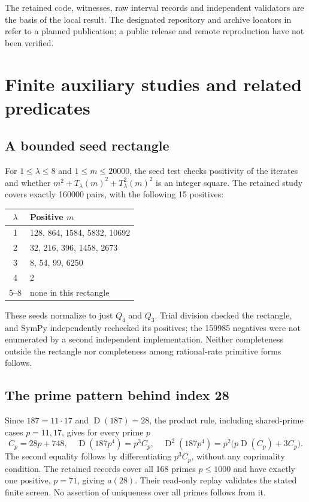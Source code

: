 \documentclass[11pt]{article}
\newcommand{\D}{\operatorname{D}}
\theoremstyle{definition}
\begin{document}
The retained code, witnesses, raw interval records and independent
validators are the basis of the local result. The designated repository
and archive locators in~\cite{project} refer to a planned publication;
a public release and remote reproduction have not been verified.

\section{Finite auxiliary studies and related predicates}\label{sec:finite}
\subsection{A bounded seed rectangle}
For $1\le\lambda\le8$ and $1\le m\le20000$, the seed test checks
positivity of the iterates and whether
$m^2+T_\lambda(m)^2+T_\lambda^2(m)^2$ is an integer square.
The retained study covers exactly 160000 pairs, with the following
15 positives:
\begin{center}\small
\begin{tabular}{cl}
\toprule
$\lambda$ & Positive $m$\\
\midrule
1 & 128, 864, 1584, 5832, 10692\\
2 & 32, 216, 396, 1458, 2673\\
3 & 8, 54, 99, 6250\\
4 & 2\\
5--8 & none in this rectangle\\
\bottomrule
\end{tabular}
\end{center}
These seeds normalize to just $Q_4$ and $Q_3$. Trial division checked
the rectangle, and SymPy independently rechecked its positives; the
159985 negatives were not enumerated by a second independent
implementation. Neither completeness outside the rectangle nor
completeness among rational-rate primitive forms follows.

\subsection{The prime pattern behind index 28}
Since $187=11\cdot17$ and $\D(187)=28$, the product rule, including
shared-prime cases $p=11,17$, gives for every prime $p$
\begin{equation}\label{eq:pattern}
 C_p=28p+748,\quad \D(187p^4)=p^3C_p,\quad
 \D^2(187p^4)=p^2\bigl(p\D(C_p)+3C_p\bigr).
\end{equation}
The second equality follows by differentiating $p^3C_p$, without any
coprimality condition. The retained records cover all 168 primes
$p\le1000$ and have exactly one positive, $p=71$, giving $a(28)$.
Their read-only replay validates the stated finite screen. No assertion
of uniqueness over all primes follows from it.
\end{document}
